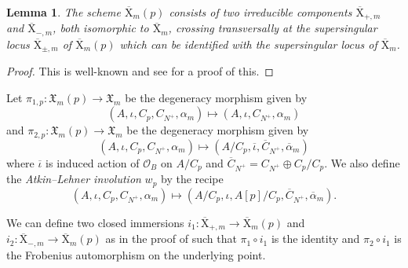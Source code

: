 \documentclass[10pt]{amsart}
\numberwithin{equation}{section}
\theoremstyle{plain}
\newtheorem{lemma}[theorem]{Lemma}
\numberwithin{equation}{section}
\theoremstyle{definition}
\theoremstyle{remark}
\def\interX{\mathfrak{X}}
\def\calO{\mathcal{O}}
\def\rmX{\mathrm{X}}
\begin{document}
\begin{lemma}\label{gamma0p}
The scheme $\overline{\rmX}_{m}(p)$ consists of two irreducible components $\overline{\rmX}_{+,m}$ and $\overline{\rmX}_{-,m}$, both isomorphic to $\overline{\rmX}_{m}$, crossing transversally at the supersingular locus $\overline{\rmX}_{\pm,m}$ of $\overline{\rmX}_{m}(p)$ which can be identified with the supersingular locus of $\overline{\rmX}_{m}$.
\end{lemma}

\begin{proof}
This is well-known and  see \cite[Theorem 4.7(v)]{Buzzard} for a proof of this.
\end{proof}

Let $\pi_{1, p}:\interX_{m}(p)\rightarrow \interX_{m}$ be the degeneracy morphism given by
\begin{equation*}
(A, \iota, C_{p}, C_{N^{+}}, \alpha_{m}) \mapsto (A, \iota, C_{N^{+}}, \alpha_{m})  
\end{equation*}
and  $\pi_{2, p}:\interX_{m}(p)\rightarrow \interX_{m}$ be the degeneracy morphism given by 
\begin{equation*}
(A, \iota, C_{p}, C_{N^{+}}, \alpha_{m}) \mapsto (A/C_{p}, \overline{\iota}, \overline{C}_{N^{+}}, \overline{\alpha}_{m})
\end{equation*}
where $\overline{\iota}$ is induced action of $\calO_{B}$ on $A/C_{p}$ and $\overline{C}_{N^{+}}=C_{N^{+}}\oplus C_{p}/C_{p}$. We also define the \emph{ Atkin--Lehner involution} $w_{p}$ by the recipe
\begin{equation*}
(A, \iota, C_{p}, C_{N^{+}}, \alpha_{m})\mapsto (A/C_{p},  \iota, A[p]/C_{p}, \overline{C}_{N^{+}}, \overline{\alpha}_{m}). 
\end{equation*}

We can define two closed immersions $i_{1}: \overline{\rmX}_{+,m}\rightarrow \overline{\rmX}_{m}(p)$ and $i_{2}: \overline{\rmX}_{-,m}\rightarrow \overline{\rmX}_{m}(p)$ as in the proof of \cite[Theorem 4.7(v)]{Buzzard} such that  $\pi_{1}\circ i_{1}$ is the identity and $\pi_{2}\circ i_{1}$ is the Frobenius automorphism on the underlying point.
\end{document}
